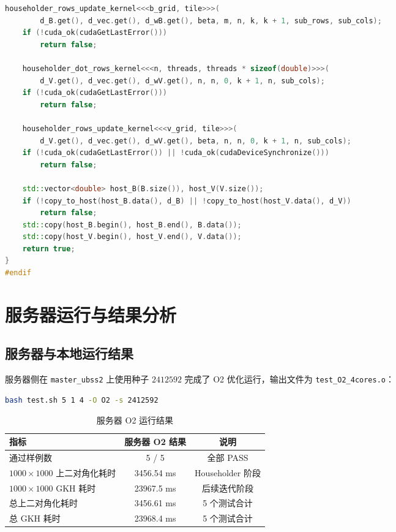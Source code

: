 \documentclass[UTF8,a4paper,10pt]{ctexart}
\begin{document}
\begin{lstlisting}[language=C++,basicstyle=\scriptsize\ttfamily,title=bidiagonalization.cpp 中 SVD GPU kernel 完整代码块]
    householder_rows_update_kernel<<<b_grid, tile>>>(
        d_B.get(), d_vec.get(), d_wB.get(), beta, m, n, k, k + 1, sub_rows, sub_cols);
    if (!cuda_ok(cudaGetLastError()))
        return false;

    householder_dot_rows_kernel<<<n, threads, threads * sizeof(double)>>>(
        d_V.get(), d_vec.get(), d_wV.get(), n, n, 0, k + 1, n, sub_cols);
    if (!cuda_ok(cudaGetLastError()))
        return false;

    householder_rows_update_kernel<<<v_grid, tile>>>(
        d_V.get(), d_vec.get(), d_wV.get(), beta, n, n, 0, k + 1, n, sub_cols);
    if (!cuda_ok(cudaGetLastError()) || !cuda_ok(cudaDeviceSynchronize()))
        return false;

    std::vector<double> host_B(B.size()), host_V(V.size());
    if (!copy_to_host(host_B.data(), d_B) || !copy_to_host(host_V.data(), d_V))
        return false;
    std::copy(host_B.begin(), host_B.end(), B.data());
    std::copy(host_V.begin(), host_V.end(), V.data());
    return true;
}
#endif
\end{lstlisting}

\section{服务器运行与结果分析}
\subsection{服务器与本地运行结果}
服务器侧在 \texttt{master\_ubss2} 上使用种子 $2412592$ 完成了 O2 优化运行，输出文件为 \texttt{test\_O2\_4cores.o}：
\begin{lstlisting}[language=bash,title=Server O2 run]
bash test.sh 5 1 4 -O O2 -s 2412592
\end{lstlisting}

\begin{table}[H]
\centering
\begin{tabular}{lcc}
\toprule
指标 & 服务器 O2 结果 & 说明 \\
\midrule
通过样例数 & 5 / 5 & 全部 PASS \\
$1000\times1000$ 上二对角化耗时 & 3456.54 ms & Householder 阶段 \\
$1000\times1000$ GKH 耗时 & 23967.5 ms & 后续迭代阶段 \\
总上二对角化耗时 & 3456.61 ms & 5 个测试合计 \\
总 GKH 耗时 & 23968.4 ms & 5 个测试合计 \\
\bottomrule
\end{tabular}
\caption{服务器 O2 运行结果}
\end{table}
\end{document}
